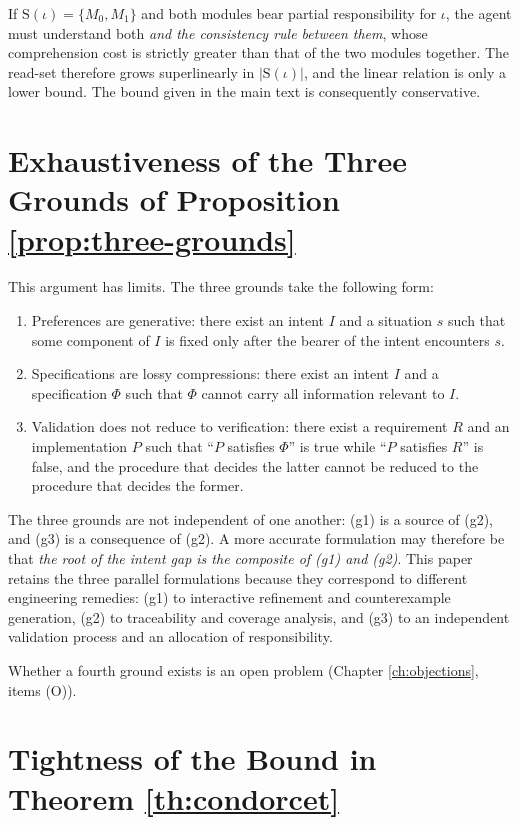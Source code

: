 If $\mathrm{S}(\iota) = \{M_0, M_1\}$ and both modules bear partial responsibility for
$\iota$, the agent must understand both \emph{and the consistency rule between them},
whose comprehension cost is strictly greater than that of the two modules together. The
read-set therefore grows superlinearly in $|\mathrm{S}(\iota)|$, and the linear relation is
only a lower bound. The bound given in the main text is consequently conservative.

\section{Exhaustiveness of the Three Grounds of Proposition \ref{prop:three-grounds}}

This argument has limits. The three grounds take the following form:

\begin{enumerate}[label=(g\arabic*)]
\item Preferences are generative: there exist an intent $I$ and a situation $s$ such that
      some component of $I$ is fixed only after the bearer of the intent encounters $s$.
\item Specifications are lossy compressions: there exist an intent $I$ and a specification
      $\Phi$ such that $\Phi$ cannot carry all information relevant to $I$.
\item Validation does not reduce to verification: there exist a requirement $R$ and an
      implementation $P$ such that ``$P$ satisfies $\Phi$'' is true while ``$P$ satisfies
      $R$'' is false, and the procedure that decides the latter cannot be reduced to the
      procedure that decides the former.
\end{enumerate}

The three grounds are not independent of one another: (g1) is a source of (g2), and (g3)
is a consequence of (g2). A more accurate formulation may therefore be that \emph{the root
of the intent gap is the composite of (g1) and (g2)}. This paper retains the three
parallel formulations because they correspond to different engineering remedies: (g1) to
interactive refinement and counterexample generation, (g2) to traceability and coverage
analysis, and (g3) to an independent validation process and an allocation of
responsibility.

Whether a fourth ground exists is an open problem (Chapter \ref{ch:objections}, items
(O)).

\section{Tightness of the Bound in Theorem \ref{th:condorcet}}

